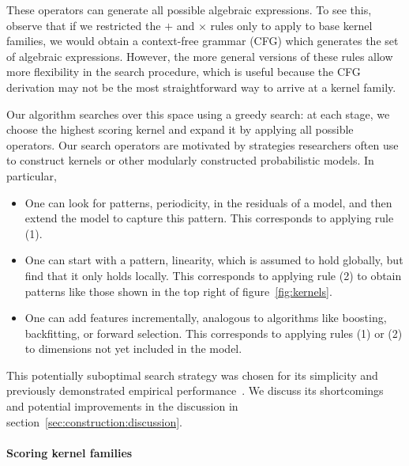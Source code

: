 These operators can generate all possible algebraic expressions.
To see this, observe that if we restricted the $+$ and $\times$ rules only to apply to base kernel families, we would obtain a context-free grammar (CFG) which generates the set of algebraic expressions.
However, the more general versions of these rules allow more flexibility in the search procedure, which is useful because the CFG derivation may not be the most straightforward way to arrive at a kernel family.

Our algorithm searches over this space using a greedy search: at each stage, we choose the highest scoring kernel and expand it by applying all possible operators.
Our search operators are motivated by strategies researchers often use to construct kernels or other modularly constructed probabilistic models.
In particular,
\begin{itemize}
\item One can look for patterns, \eg periodicity, in the residuals of a model, and then extend the model to capture this pattern.
This corresponds to applying rule (1).
\item One can start with a pattern, \eg linearity, which is assumed to hold globally, but find that it only holds locally.
This corresponds to applying rule (2) to obtain patterns like those shown in the top right of figure~\ref{fig:kernels}.
\item One can add features incrementally, analogous to algorithms like boosting, backfitting, or forward selection.
This corresponds to applying rules (1) or (2) to dimensions not yet included in the model.
\end{itemize}

This potentially suboptimal search strategy was chosen for its simplicity and previously demonstrated empirical performance~\citep{Grosse2012-zi}.
We discuss its shortcomings and potential improvements in the discussion in section~\ref{sec:construction:discussion}.

\paragraph{Scoring kernel families}


